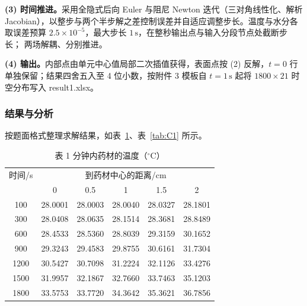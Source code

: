 \textbf{(3) 时间推进。}采用全隐式后向 Euler 与阻尼 Newton 迭代（三对角线性化、解析
Jacobian），以整步与两个半步解之差控制误差并自适应调整步长。温度与水分各取误差预算
$2.5\times10^{-5}$，最大步长 $1\,\mathrm{s}$，在整秒输出点与输入分段节点处截断步长；
两场解耦、分别推进。

\textbf{(4) 输出。}内部点由单元中心值局部二次插值获得，表面点按 (2) 反解，$t=0$ 行
单独保留；结果四舍五入至 4 位小数，按附件 3 模板自 $t=1\,\mathrm{s}$ 起将
$1800\times21$ 时空分布写入 result1.xlsx。

\subsubsection{结果与分析}

按题面格式整理求解结果，如表~\ref{tab:T1}、表~\ref{tab:C1} 所示。

\begin{table}[htbp]
  \centering
  \caption{表 1 分钟内药材的温度（$^{\circ}\mathrm{C}$）}
  \label{tab:T1}
  \begin{tabular}{cccccc}
    \hline
    时间/s & \multicolumn{5}{c}{到药材中心的距离/cm} \\
    & 0 & 0.5 & 1 & 1.5 & 2 \\
    \hline
    100   & 28.0001 & 28.0003 & 28.0040 & 28.0327 & 28.1801 \\
    300   & 28.0408 & 28.0635 & 28.1514 & 28.3681 & 28.8489 \\
    600   & 28.4533 & 28.5360 & 28.8039 & 29.3159 & 30.1652 \\
    900   & 29.3243 & 29.4583 & 29.8755 & 30.6161 & 31.7304 \\
    1200  & 30.5427 & 30.7098 & 31.2224 & 32.1126 & 33.4276 \\
    1500  & 31.9957 & 32.1867 & 32.7660 & 33.7463 & 35.1203 \\
    1800  & 33.5753 & 33.7720 & 34.3642 & 35.3621 & 36.7856 \\
    \hline
  \end{tabular}
\end{table}

